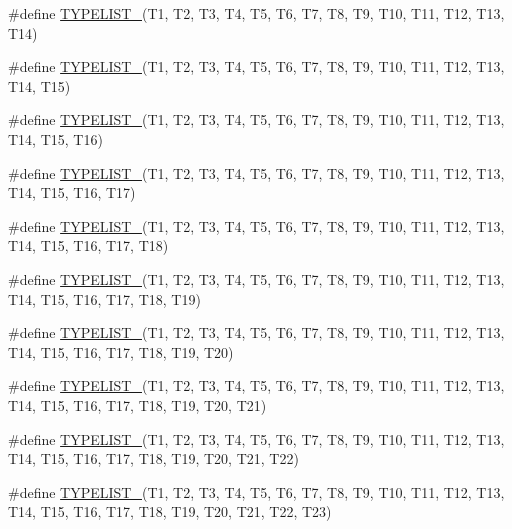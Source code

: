 \begin{DoxyCompactItemize}
\item 
\#define \mbox{\hyperlink{adat-devel_2lib_2adat_2typelist_8h_ab2c989473273a930f3ab218173426442}{T\+Y\+P\+E\+L\+I\+S\+T\+\_}}(T1,  T2,  T3,  T4,  T5,  T6,  T7,  T8,  T9,  T10,  T11,  T12,  T13,  T14)
\item 
\#define \mbox{\hyperlink{adat-devel_2lib_2adat_2typelist_8h_a45a2c78a073e118590d766743e9e1cb4}{T\+Y\+P\+E\+L\+I\+S\+T\+\_}}(T1,  T2,  T3,  T4,  T5,  T6,  T7,  T8,  T9,  T10,  T11,  T12,  T13,  T14,  T15)
\item 
\#define \mbox{\hyperlink{adat-devel_2lib_2adat_2typelist_8h_a6937a5c445f60bbbec8301308e7cd574}{T\+Y\+P\+E\+L\+I\+S\+T\+\_}}(T1,  T2,  T3,  T4,  T5,  T6,  T7,  T8,  T9,  T10,  T11,  T12,  T13,  T14,  T15,  T16)
\item 
\#define \mbox{\hyperlink{adat-devel_2lib_2adat_2typelist_8h_a4a0cd10f751f31a48903abe8dbc7fb25}{T\+Y\+P\+E\+L\+I\+S\+T\+\_}}(T1,  T2,  T3,  T4,  T5,  T6,  T7,  T8,  T9,  T10,  T11,  T12,  T13,  T14,  T15,  T16,  T17)
\item 
\#define \mbox{\hyperlink{adat-devel_2lib_2adat_2typelist_8h_a82f1bd0dbc3ab3271be8ebfe64772b53}{T\+Y\+P\+E\+L\+I\+S\+T\+\_}}(T1,  T2,  T3,  T4,  T5,  T6,  T7,  T8,  T9,  T10,  T11,  T12,  T13,  T14,  T15,  T16,  T17,  T18)
\item 
\#define \mbox{\hyperlink{adat-devel_2lib_2adat_2typelist_8h_a3315b3e94518814a72a24846db8ab2e7}{T\+Y\+P\+E\+L\+I\+S\+T\+\_}}(T1,  T2,  T3,  T4,  T5,  T6,  T7,  T8,  T9,  T10,  T11,  T12,  T13,  T14,  T15,  T16,  T17,  T18,  T19)
\item 
\#define \mbox{\hyperlink{adat-devel_2lib_2adat_2typelist_8h_a5091382117677e16181cd074baa2e2c6}{T\+Y\+P\+E\+L\+I\+S\+T\+\_}}(T1,  T2,  T3,  T4,  T5,  T6,  T7,  T8,  T9,  T10,  T11,  T12,  T13,  T14,  T15,  T16,  T17,  T18,  T19,  T20)
\item 
\#define \mbox{\hyperlink{adat-devel_2lib_2adat_2typelist_8h_a041904bbd03424f995a7286e153c601a}{T\+Y\+P\+E\+L\+I\+S\+T\+\_}}(T1,  T2,  T3,  T4,  T5,  T6,  T7,  T8,  T9,  T10,  T11,  T12,  T13,  T14,  T15,  T16,  T17,  T18,  T19,  T20,  T21)
\item 
\#define \mbox{\hyperlink{adat-devel_2lib_2adat_2typelist_8h_a5628f10cfac8859ff254aed9bb2f955a}{T\+Y\+P\+E\+L\+I\+S\+T\+\_}}(T1,  T2,  T3,  T4,  T5,  T6,  T7,  T8,  T9,  T10,  T11,  T12,  T13,  T14,  T15,  T16,  T17,  T18,  T19,  T20,  T21,  T22)
\item 
\#define \mbox{\hyperlink{adat-devel_2lib_2adat_2typelist_8h_a47cd47862e4ddf30c5c4375f301f72b5}{T\+Y\+P\+E\+L\+I\+S\+T\+\_}}(T1,  T2,  T3,  T4,  T5,  T6,  T7,  T8,  T9,  T10,  T11,  T12,  T13,  T14,  T15,  T16,  T17,  T18,  T19,  T20,  T21,  T22,  T23)

\end{DoxyCompactItemize}
